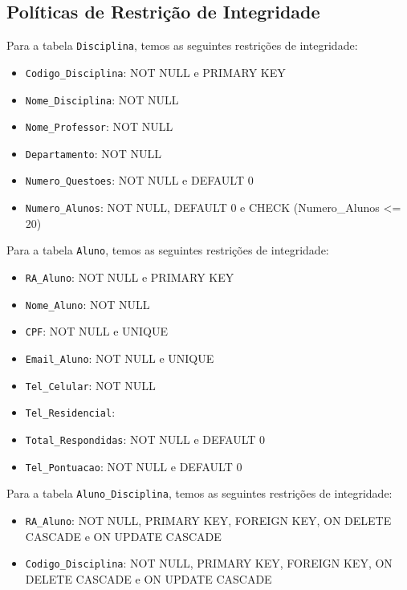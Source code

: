 \documentclass[12pt,a4paper]{article}
\begin{document}
\subsection{Políticas de Restrição de Integridade}
\vspace{0.5cm}
Para a tabela \texttt{Disciplina}, temos as seguintes restrições de integridade:

\begin{itemize}
    \item {\texttt{Codigo\_Disciplina}}: NOT NULL e PRIMARY KEY
    \item {\texttt{Nome\_Disciplina}}: NOT NULL
    \item {\texttt{Nome\_Professor}}: NOT NULL
    \item {\texttt{Departamento}}: NOT NULL
    \item {\texttt{Numero\_Questoes}}: NOT NULL e DEFAULT 0
    \item {\texttt{Numero\_Alunos}}: NOT NULL, DEFAULT 0 e CHECK (Numero\_Alunos <= 20) 
\end{itemize}

\vspace{0.5cm}
Para a tabela \texttt{Aluno}, temos as seguintes restrições de integridade:

\begin{itemize}
    \item {\texttt{RA\_Aluno}}: NOT NULL e PRIMARY KEY
    \item {\texttt{Nome\_Aluno}}: NOT NULL
    \item \texttt{CPF}: NOT NULL e UNIQUE
    \item \texttt{Email\_Aluno}: NOT NULL e UNIQUE
    \item \texttt{Tel\_Celular}: NOT NULL
    \item \texttt{Tel\_Residencial}:
    \item \texttt{Total\_Respondidas}: NOT NULL e DEFAULT 0
    \item \texttt{Tel\_Pontuacao}: NOT NULL e DEFAULT 0
\end{itemize}

\vspace{0.5cm}
Para a tabela \texttt{Aluno\_Disciplina}, temos as seguintes restrições de integridade:

\begin{itemize}
    \item {\texttt{RA\_Aluno}}: NOT NULL, PRIMARY KEY, FOREIGN KEY, ON DELETE CASCADE e ON UPDATE CASCADE
    \item {\texttt{Codigo\_Disciplina}}: NOT NULL, PRIMARY KEY, FOREIGN KEY, ON DELETE CASCADE e ON UPDATE CASCADE
\end{itemize}
\end{document}
